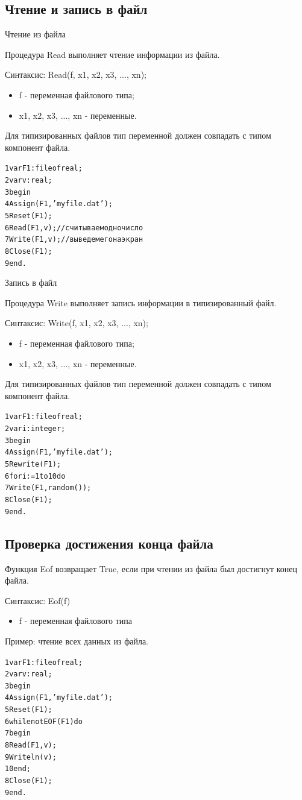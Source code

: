 \documentclass{beamer}
\begin{document}
\subsection{Чтение и запись в файл}
\begin{frame}[fragile]{Чтение из файла}
\begin{block}{Процедура Read}
выполняет чтение информации из файла.
\end{block}
Синтаксис: Read(f, x1, x2, x3, $...$, xn);
\begin{itemize}
\item f - переменная файлового типа;
\item x1, x2, x3, $...$, xn - переменные.
\end{itemize}
Для типизированных файлов тип переменной должен совпадать с типом компонент файла.
\begin{alltt}
 1 var F1: file of real; 
 2 var v: real; 
 3 begin
 4   Assign(F1, 'myfile.dat');
 5   Reset(F1);
 6   Read(F1, v); //считываем одно число
 7   Write(F1, v); //выведем его на экран
 8   Close(F1);
 9 end.
\end{alltt}
\end{frame} 

\begin{frame}[fragile]{Запись в файл}
\begin{block}{Процедура Write}
выполняет запись информации в типизированный файл.
\end{block}
Синтаксис: Write(f, x1, x2, x3, $...$, xn);
\begin{itemize}
\item f - переменная файлового типа;
\item x1, x2, x3, $...$, xn - переменные.
\end{itemize}
Для типизированных файлов тип переменной должен совпадать с типом компонент файла.
\begin{alltt}
 1 var F1: file of real; 
 2 var i: integer;
 3 begin
 4   Assign(F1, 'myfile.dat');
 5   Rewrite(F1);
 6   for i := 1 to 10 do 
 7     Write(F1, random());  
 8   Close(F1);
 9 end.
\end{alltt}
\end{frame} 

\subsection{Проверка достижения конца файла}
\begin{frame}[fragile]
\begin{block}{Функция Eof}
возвращает True, если при чтении из файла был достигнут конец файла.
\end{block}
Синтаксис: Eof(f)
\begin{itemize}
\item f - переменная файлового типа
\end{itemize}
Пример: чтение всех данных из файла.
\begin{alltt}
 1 var F1: file of real; 
 2 var v: real;
 3 begin
 4   Assign(F1, 'myfile.dat');
 5   Reset(F1);
 6   while not EOF(F1) do 
 7   begin
 8     Read(F1, v);  
 9     Writeln(v); 
 10  end;
 8   Close(F1);
 9 end.
\end{alltt}
\end{frame}
\end{document}
